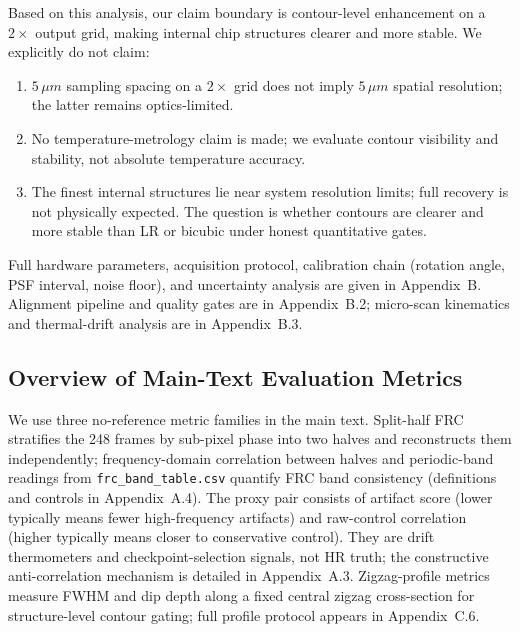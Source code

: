 Based on this analysis, our claim boundary is contour-level enhancement on a $2\times$ output grid, making internal chip structures clearer and more stable. We explicitly do not claim:
\begin{enumerate}
\item $5\,\ensuremath{\mu m}$ sampling spacing on a $2\times$ grid does not imply $5\,\ensuremath{\mu m}$ spatial resolution; the latter remains optics-limited.
\item No temperature-metrology claim is made; we evaluate contour visibility and stability, not absolute temperature accuracy.
\item The finest internal structures lie near system resolution limits; full recovery is not physically expected. The question is whether contours are clearer and more stable than LR or bicubic under honest quantitative gates.
\end{enumerate}

Full hardware parameters, acquisition protocol, calibration chain (rotation angle, PSF interval, noise floor), and uncertainty analysis are given in Appendix~B. Alignment pipeline and quality gates are in Appendix~B.2; micro-scan kinematics and thermal-drift analysis are in Appendix~B.3.

\subsection{Overview of Main-Text Evaluation Metrics}

We use three no-reference metric families in the main text. Split-half FRC stratifies the 248 frames by sub-pixel phase into two halves and reconstructs them independently; frequency-domain correlation between halves and periodic-band readings from \texttt{frc\_band\_table.csv} quantify FRC band consistency (definitions and controls in Appendix~A.4). The proxy pair consists of artifact score (lower typically means fewer high-frequency artifacts) and raw-control correlation (higher typically means closer to conservative control). They are drift thermometers and checkpoint-selection signals, not HR truth; the constructive anti-correlation mechanism is detailed in Appendix~A.3. Zigzag-profile metrics measure FWHM and dip depth along a fixed central zigzag cross-section for structure-level contour gating; full profile protocol appears in Appendix~C.6.
